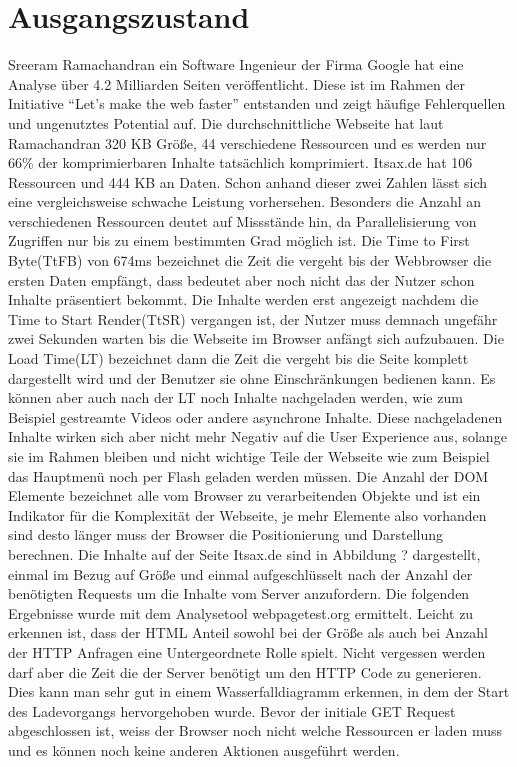 \section{Ausgangszustand}
Sreeram Ramachandran ein Software Ingenieur der Firma Google hat eine Analyse über 4.2 Milliarden Seiten veröffentlicht. Diese ist im Rahmen der Initiative ``Let's make the web faster'' entstanden und zeigt häufige Fehlerquellen und ungenutztes Potential auf. Die durchschnittliche Webseite hat laut Ramachandran 320 KB Größe, 44 verschiedene Ressourcen und es werden nur 66\% der komprimierbaren Inhalte tatsächlich komprimiert.
Itsax.de hat 106 Ressourcen und 444 KB an Daten. Schon anhand dieser zwei Zahlen lässt sich eine vergleichsweise schwache Leistung vorhersehen. Besonders die Anzahl an verschiedenen Ressourcen deutet auf Missstände hin, da Parallelisierung von Zugriffen nur bis zu einem bestimmten Grad möglich ist. Die Time to First Byte(TtFB) von 674ms bezeichnet die Zeit die vergeht bis der Webbrowser die ersten Daten empfängt, dass bedeutet aber noch nicht das der Nutzer schon Inhalte präsentiert bekommt. Die Inhalte werden erst angezeigt nachdem die Time to Start Render(TtSR) vergangen ist, der Nutzer muss demnach ungefähr zwei Sekunden warten bis die Webseite im Browser anfängt sich aufzubauen. Die Load Time(LT) bezeichnet dann die Zeit die vergeht bis die Seite komplett dargestellt wird und der Benutzer sie ohne Einschränkungen bedienen kann. Es können  aber auch nach der LT noch Inhalte nachgeladen werden, wie zum Beispiel gestreamte Videos oder andere asynchrone Inhalte. Diese nachgeladenen Inhalte wirken sich aber nicht mehr Negativ auf die User Experience aus, solange sie im Rahmen bleiben und nicht wichtige Teile der Webseite wie zum Beispiel das Hauptmenü noch per Flash geladen werden müssen. Die Anzahl der DOM Elemente bezeichnet alle vom Browser zu verarbeitenden Objekte und ist ein Indikator für die Komplexität der Webseite, je mehr Elemente also vorhanden sind desto länger muss der Browser die Positionierung und Darstellung berechnen. Die Inhalte auf der Seite Itsax.de sind in Abbildung ? dargestellt, einmal im Bezug auf Größe und einmal aufgeschlüsselt nach der Anzahl der benötigten Requests um die Inhalte vom Server anzufordern. Die folgenden Ergebnisse wurde mit dem Analysetool webpagetest.org ermittelt. Leicht zu erkennen ist, dass der HTML Anteil sowohl bei der Größe als auch bei Anzahl der HTTP Anfragen eine Untergeordnete Rolle spielt. Nicht vergessen werden darf aber die Zeit die der Server benötigt um den HTTP Code zu generieren. Dies kann man sehr gut in einem Wasserfalldiagramm erkennen, in dem der Start des Ladevorgangs hervorgehoben wurde. Bevor der initiale GET Request abgeschlossen ist, weiss der Browser noch nicht welche Ressourcen er laden muss und es können noch keine anderen Aktionen ausgeführt werden.
